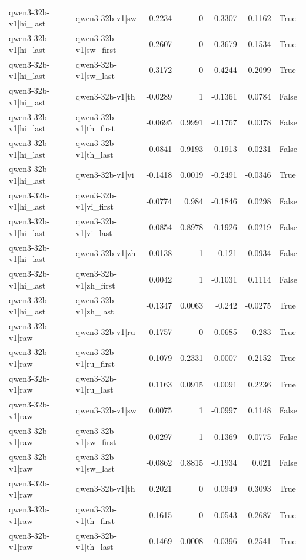 \begin{table}
\begin{tabular}{l l r r r r l}
qwen3-32b-v1|hi_last & qwen3-32b-v1|sw & -0.2234 & 0 & -0.3307 & -0.1162 & True \\
qwen3-32b-v1|hi_last & qwen3-32b-v1|sw_first & -0.2607 & 0 & -0.3679 & -0.1534 & True \\
qwen3-32b-v1|hi_last & qwen3-32b-v1|sw_last & -0.3172 & 0 & -0.4244 & -0.2099 & True \\
qwen3-32b-v1|hi_last & qwen3-32b-v1|th & -0.0289 & 1 & -0.1361 & 0.0784 & False \\
qwen3-32b-v1|hi_last & qwen3-32b-v1|th_first & -0.0695 & 0.9991 & -0.1767 & 0.0378 & False \\
qwen3-32b-v1|hi_last & qwen3-32b-v1|th_last & -0.0841 & 0.9193 & -0.1913 & 0.0231 & False \\
qwen3-32b-v1|hi_last & qwen3-32b-v1|vi & -0.1418 & 0.0019 & -0.2491 & -0.0346 & True \\
qwen3-32b-v1|hi_last & qwen3-32b-v1|vi_first & -0.0774 & 0.984 & -0.1846 & 0.0298 & False \\
qwen3-32b-v1|hi_last & qwen3-32b-v1|vi_last & -0.0854 & 0.8978 & -0.1926 & 0.0219 & False \\
qwen3-32b-v1|hi_last & qwen3-32b-v1|zh & -0.0138 & 1 & -0.121 & 0.0934 & False \\
qwen3-32b-v1|hi_last & qwen3-32b-v1|zh_first & 0.0042 & 1 & -0.1031 & 0.1114 & False \\
qwen3-32b-v1|hi_last & qwen3-32b-v1|zh_last & -0.1347 & 0.0063 & -0.242 & -0.0275 & True \\
qwen3-32b-v1|raw & qwen3-32b-v1|ru & 0.1757 & 0 & 0.0685 & 0.283 & True \\
qwen3-32b-v1|raw & qwen3-32b-v1|ru_first & 0.1079 & 0.2331 & 0.0007 & 0.2152 & True \\
qwen3-32b-v1|raw & qwen3-32b-v1|ru_last & 0.1163 & 0.0915 & 0.0091 & 0.2236 & True \\
qwen3-32b-v1|raw & qwen3-32b-v1|sw & 0.0075 & 1 & -0.0997 & 0.1148 & False \\
qwen3-32b-v1|raw & qwen3-32b-v1|sw_first & -0.0297 & 1 & -0.1369 & 0.0775 & False \\
qwen3-32b-v1|raw & qwen3-32b-v1|sw_last & -0.0862 & 0.8815 & -0.1934 & 0.021 & False \\
qwen3-32b-v1|raw & qwen3-32b-v1|th & 0.2021 & 0 & 0.0949 & 0.3093 & True \\
qwen3-32b-v1|raw & qwen3-32b-v1|th_first & 0.1615 & 0 & 0.0543 & 0.2687 & True \\
qwen3-32b-v1|raw & qwen3-32b-v1|th_last & 0.1469 & 0.0008 & 0.0396 & 0.2541 & True \\

\end{tabular}
\end{table}
